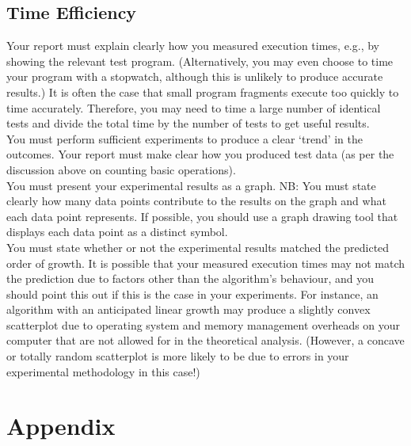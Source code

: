 \documentclass[]{article}
\begin{document}
\subsection{Time Efficiency}
Your report must explain clearly how you measured execution times, e.g., by showing the
relevant test program. (Alternatively, you may even choose to time your program with a
stopwatch, although this is unlikely to produce accurate results.) It is often the case that small
program fragments execute too quickly to time accurately. Therefore, you may need to time a
large number of identical tests and divide the total time by the number of tests to get useful
results.
\\
You must perform sufficient experiments to produce a clear ‘trend’ in the outcomes. Your
report must make clear how you produced test data (as per the discussion above on counting
basic operations).
\\
You must present your experimental results as a graph. NB: You must state clearly how many
data points contribute to the results on the graph and what each data point represents. If
possible, you should use a graph drawing tool that displays each data point as a distinct
symbol.
\\
You must state whether or not the experimental results matched the predicted order of growth.
It is possible that your measured execution times may not match the prediction due to factors
other than the algorithm’s behaviour, and you should point this out if this is the case in your
experiments. For instance, an algorithm with an anticipated linear growth may produce a
slightly convex scatterplot due to operating system and memory management overheads on
your computer that are not allowed for in the theoretical analysis. (However, a concave or
totally random scatterplot is more likely to be due to errors in your experimental methodology
in this case!)

\section{Appendix}
\end{document}
